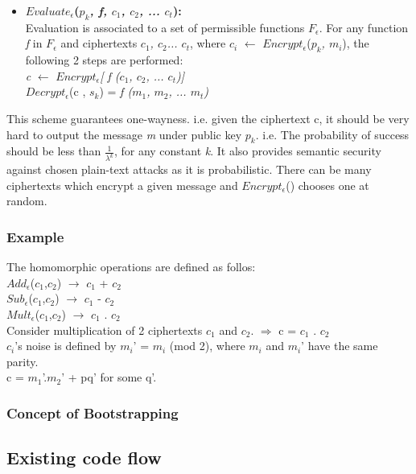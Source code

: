 \begin{itemize}
\item \textbf{\textit{$Evaluate_\epsilon$}(\textit{$p_k$, f, $c_1$, $c_2$, ... $c_t$}):}\\Evaluation is associated to a set of permissible functions \textit{$F_\epsilon$}. For any function \textit{f} in \textit{$F_\epsilon$} and ciphertexts \textit{$c_1$, $c_2$... $c_t$}, where \textit{$c_i$} $\leftarrow$ \textit{$Encrypt_\epsilon$}(\textit{$p_k$, $m_i$}), the following 2 steps are performed:\\
\textit{c} $\leftarrow$ \textit{$Encrypt_\epsilon$[ f ($c_1$, $c_2$, ... $c_t$)]}\\
$Decrypt_\epsilon$(c , $s_k$) = \textit{f ($m_1$, $m_2$, ... $m_t$)}
\end{itemize}
This scheme guarantees one-wayness. i.e. given the ciphertext c, it should be very hard to output the message \textit{m} under public key $p_k$. i.e. The probability of success should be less than $\frac{1}{\lambda^k}$, for any constant \textit{k}. It also provides semantic security against chosen plain-text attacks as it is probabilistic. There can be many ciphertexts which encrypt a given message and $Encrypt_\epsilon$() chooses one at random. 
\subsubsection*{Example}
The homomorphic operations are defined as follos:\\
$Add_\epsilon$($c_1$,$c_2$) $\rightarrow$ $c_1$ +  $c_2$\\
$Sub_\epsilon$($c_1$,$c_2$) $\rightarrow$ $c_1$ -  $c_2$\\
$Mult_\epsilon$($c_1$,$c_2$) $\rightarrow$ $c_1$ .  $c_2$\\
Consider multiplication of 2 ciphertexts $c_1$ and $c_2$. $\Rightarrow$ c = $c_1$ . $c_2$\\
$c_i$'s noise is defined by $m_i$' = $m_i$ (mod 2), where $m_i$ and $m_i$' have the same parity.\\
c = $m_1$'.$m_2$' + pq' for some q'.\\
\subsubsection*{Concept of Bootstrapping}

\subsection{Existing code flow}
\label{5_1_1}

